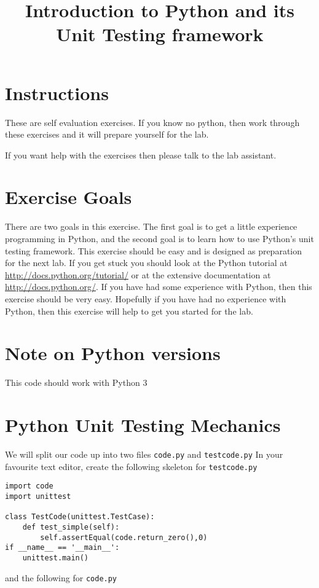 \documentclass{paper}
\title{Introduction to Python and its Unit Testing framework}
\begin{document}
\maketitle
\section*{Instructions}
These are self evaluation exercises. If you know no python, then work through
these exercises and it will prepare yourself for the lab.

If you want help with the exercises then please talk to the lab
assistant.

\section*{Exercise Goals}
There are two goals in this exercise. The first goal is to get a little
experience programming in Python, and the second goal is to learn how
to use Python's unit testing framework. This exercise should be easy and is
designed as preparation for the next lab. If you get stuck you should
look at the Python tutorial at \url{http://docs.python.org/tutorial/}
or at the extensive documentation at \url{http://docs.python.org/}. If
you have had some experience with Python, then this exercise should be very
easy. Hopefully if you have had no experience with Python, then this
exercise will help to get you started for the  lab.
\section*{Note on Python versions}
This code should work with Python 3

\section*{Python Unit Testing Mechanics}
We will split our code up into two files \texttt{code.py} and
\texttt{testcode.py} In your favourite text editor, create the following
skeleton for \texttt{testcode.py}

\begin{lstlisting}
import code
import unittest

class TestCode(unittest.TestCase):
    def test_simple(self):
        self.assertEqual(code.return_zero(),0)
if __name__ == '__main__':
    unittest.main()
\end{lstlisting}

and the following for {\tt code.py}
\end{document}
